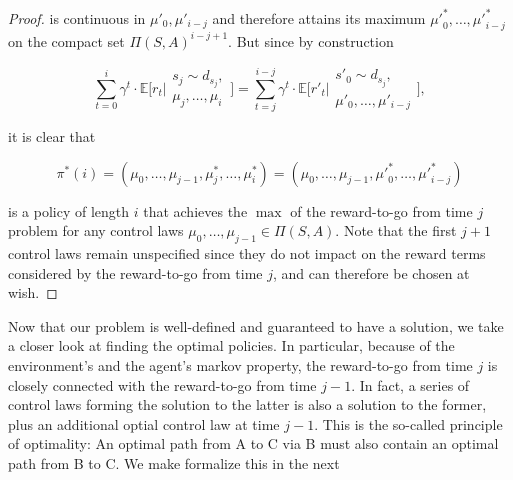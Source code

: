 \documentclass[11pt]{article} %
\begin{document}
\begin{proof}
is continuous in $\mu'_0,\mu'_{i-j}$ and therefore attains its maximum ${\mu'}^*_0,\dots,{\mu'}^*_{i-j}$ on the compact set $\Pi(S,A)^{i-j+1}$. But since by construction

\begin{equation}
	\sum\limits_{t=0}^i \gamma^t \cdot \mathbb{E} \Big[ r_t \Big| \begin{array}{c}
																		s_j \sim d_{s_j}, \\
																		\mu_j,\dots,\mu_i
																	\end{array} \Big]  = \sum\limits_{t=j}^{i-j} \gamma^t \cdot \mathbb{E} \Big[ r'_t \Big| \begin{array}{c}
																		s'_0 \sim d_{s_j}, \\
																		\mu'_0,\dots,\mu'_{i-j}
																	\end{array} \Big],
\end{equation}

it is clear that 

\begin{equation}
	\pi^*(i) = (\mu_0,\dots,\mu_{j-1},\mu^*_j,\dots,\mu^*_i) = (\mu_0,\dots,\mu_{j-1},{\mu'}^*_0,\dots,{\mu'}^*_{i-j})
\end{equation}

is a policy of length $i$ that achieves the $\max$ of the reward-to-go from time $j$ problem for any control laws $\mu_0,\dots,\mu_{j-1} \in \Pi(S,A)$. Note that the first $j+1$ control laws remain unspecified since they do not impact on the reward terms considered by the reward-to-go from time $j$, and can therefore be chosen at wish.

\end{proof}

Now that our problem is well-defined and guaranteed to have a solution, we take a closer look at finding the optimal policies. In particular, because of the environment's and the agent's markov property, the reward-to-go from time $j$ is closely connected with the reward-to-go from time $j-1$. In fact, a series of control laws forming the solution to the latter is also a solution to the former, plus an additional optial control law at time $j-1$. This is the so-called principle of optimality: An optimal path from A to C via B must also contain an optimal path from B to C. We make formalize this in the next
\end{document}
